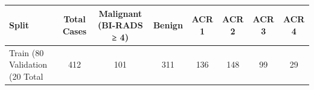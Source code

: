 \begin{tabular}{|l|c|c|c|c|c|c|c|}
\toprule
Split & Total Cases & Malignant (BI-RADS ≥ 4) & Benign & ACR 1 & ACR 2 & ACR 3 & ACR 4 \\
\midrule
Train (80%
Validation (20%
Total & 412 & 101 & 311 & 136 & 148 & 99 & 29 \\
\bottomrule
\end{tabular}
